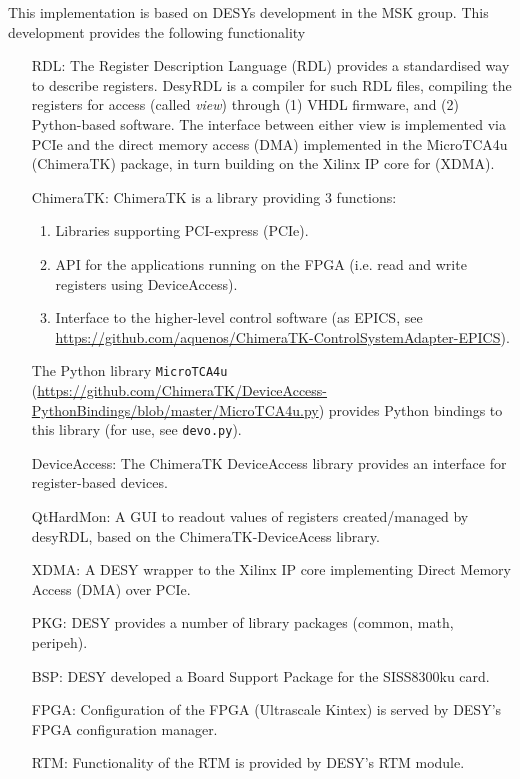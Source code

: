 \documentclass[12pt]{amsart}
\begin{document}
This implementation is based on DESYs development in the MSK group.
This development provides the following functionality
\begin{itemize}
\item[RDL:] The Register Description Language (RDL) provides a standardised way to describe registers.
	DesyRDL is a compiler for such RDL files, compiling the registers for access (called {\em view}) through
	(1) VHDL firmware, and (2) Python-based software.
	The interface between either view is implemented via PCIe and the direct memory access (DMA)
	implemented in the MicroTCA4u (ChimeraTK) package, in turn building on the Xilinx IP core for (XDMA).
	
\item[ChimeraTK:] ChimeraTK is a library providing 3 functions:
		\begin{enumerate}
		\item Libraries supporting PCI-express (PCIe).
		\item API for the applications running on the FPGA (i.e. read and write registers using DeviceAccess).
		\item Interface to the higher-level control software (as EPICS, 
			see \url{https://github.com/aquenos/ChimeraTK-ControlSystemAdapter-EPICS}).
		\end{enumerate}
		The Python library \verb|MicroTCA4u| (\url{https://github.com/ChimeraTK/DeviceAccess-PythonBindings/blob/master/MicroTCA4u.py}) 
		provides Python bindings to this library (for use, see \verb|devo.py|).
		
\item[DeviceAccess:] The ChimeraTK DeviceAccess library provides an interface for register-based devices.

\item[QtHardMon:] A GUI to readout values of registers created/managed by desyRDL, based on the ChimeraTK-DeviceAcess library.
	
\item[XDMA:] A DESY wrapper to the Xilinx IP core implementing Direct Memory Access (DMA) over PCIe.

\item[PKG:] DESY provides a number of library packages (common, math, peripeh).

\item[BSP:] DESY developed a Board Support Package for the SISS8300ku card.

\item[FPGA:] Configuration of the FPGA (Ultrascale Kintex) is served by DESY's FPGA configuration manager.	

\item[RTM:] Functionality of the RTM is provided by DESY's RTM module.

\end{itemize}
\end{document}
